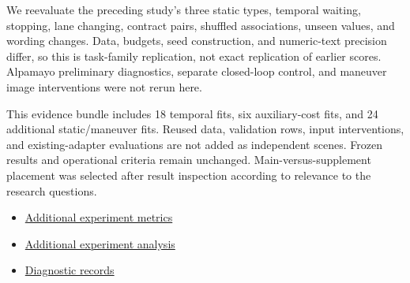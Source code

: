 \documentclass[11pt,a4paper]{article}
\begin{document}
We reevaluate the preceding study's three static types, temporal waiting, stopping, lane changing, contract pairs, shuffled associations, unseen values, and wording changes. Data, budgets, seed construction, and numeric-text precision differ, so this is task-family replication, not exact replication of earlier scores. Alpamayo preliminary diagnostics, separate closed-loop control, and maneuver image interventions were not rerun here.\par

This evidence bundle includes 18 temporal fits, six auxiliary-cost fits, and 24 additional static/maneuver fits. Reused data, validation rows, input interventions, and existing-adapter evaluations are not added as independent scenes. Frozen results and operational criteria remain unchanged. Main-versus-supplement placement was selected after result inspection according to relevance to the research questions.\par

\begin{itemize}\setlength{\itemsep}{0pt}\setlength{\parsep}{0pt}\setlength{\topsep}{2pt}
\item \href{\detokenize{../experiments-section-2026-09-30-003/multitask_metrics.csv}}{Additional experiment metrics}
\item \href{\detokenize{../../../../../../../guardsynth-cc-worktrees/guardsynth-additional-20260930/projects/04-guardsynth-coc/artifacts/public/paper1-method-preservation-001/multitask-contract-analysis-2026-09-30-001/REPORT_KO.md}}{Additional experiment analysis}
\item \href{\detokenize{../../paper1-temporal-diversity-001/expanded-diagnostics-analysis-2026-09-30-001/RESULT.json}}{Diagnostic records}
\end{itemize}
\end{document}
